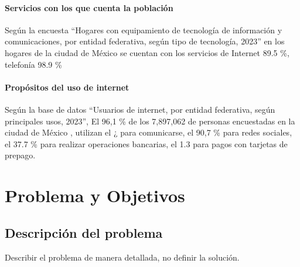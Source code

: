\subsubsection{Servicios con los que cuenta la población}

Según la encuesta “Hogares con equipamiento de tecnología de información y comunicaciones, por entidad
federativa, según tipo de tecnología, 2023” en los hogares de la ciudad de México se cuentan con los servicios
de Internet 89.5 \%, telefonía 98.9 \%

\cite{ENDUTIH2023}

\subsubsection{Propósitos del uso de internet}

Según la base de datos “Usuarios de internet, por entidad federativa, según principales usos, 2023”, El
96,1 \% de los 7,897,062 de personas encuestadas en la ciudad de México , utilizan el ¿ para comunicarse, el
90,7 \% para redes sociales, el 37.7 \% para realizar operaciones bancarias, el 1.3 para pagos con tarjetas de
prepago.\cite{ENDUTIH2023}


\chapter{Problema y Objetivos}
 























\section{Descripción del problema}
Describir el problema de manera detallada, no definir la solución.







